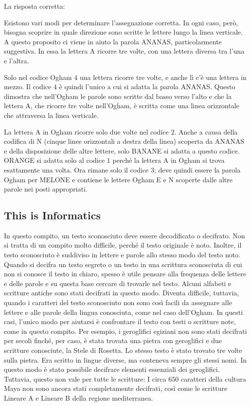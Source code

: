 \documentclass[a4paper,11pt]{report}
\newcommand{\taskGraphicsFolder}{..}
\begin{document}
La risposta corretta:

{\centering%
\par}

Esistono vari modi per determinare l’assegnazione corretta. In ogni caso, però, bisogna scoprire in quale direzione sono scritte le lettere lungo la linea verticale. A questo proposito ci viene in aiuto la parola ANANAS, particolarmente suggestiva. In essa la lettera A ricorre tre volte, con una lettera diversa tra l’una e l’altra.

Solo nel codice Ogham $4$ una lettera ricorre tre volte, e anche lì c’è una lettera in mezzo. Il codice $4$ è quindi l’unico a cui si adatta la parola ANANAS. Questo dimostra che nell’Ogham le parole sono scritte dal basso verso l’alto e che la lettera A, che ricorre tre volte nell’Ogham, è scritta come una linea orizzontale che attraversa la linea verticale.

La lettera A in Ogham ricorre solo due volte nel codice $2$. Anche a causa della codifica di N (cinque linee orizzontali a destra della linea) scoperta da ANANAS e della disposizione delle altre lettere, solo BANANE si adatta a questo codice. ORANGE si adatta solo al codice $1$ perché la lettera A in Ogham si trova esattamente una volta. Ora rimane solo il codice $3$; deve quindi essere la parola Ogham per MELONE e contiene le lettere Ogham E e N scoperte dalle altre parole nei posti appropriati.


\subsection*{This is Informatics}

In questo compito, un testo sconosciuto deve essere decodificato o decifrato.  Non si tratta di un compito molto difficile, perché il testo originale è noto. Inoltre, il testo sconosciuto è suddiviso in lettere e parole allo stesso modo del testo noto. Quando si decifra un testo segreto o un testo in una scrittura sconosciuta di cui non si conosce il testo in chiaro, spesso è utile pensare alla frequenza delle lettere e delle parole e su questa base cercare di trovarle nel testo. Alcuni alfabeti e scritture antiche sono stati decifrati in questo modo. Diventa difficile, tuttavia, quando i caratteri del testo sconosciuto non sono così facili da assegnare alle lettere e alle parole della lingua conosciuta, come nel caso dell’Ogham. In questi casi, l’unico modo per aiutarsi è confrontare il testo con testi o scritture note, come in questo compito. Per esempio, i geroglifici egiziani non sono stati decifrati per secoli finché, per caso, è stata trovata una pietra con geroglifici e due scritture conosciute, la Stele di Rosetta. Lo stesso testo è stato trovato tre volte sulla pietra. Era scritto in lingue diverse, ma conteneva sempre gli stessi nomi. In questo modo è stato possibile decifrare elementi essenziali dei geroglifici. Tuttavia, questo non vale per tutte le scritture: I circa $650$ caratteri della cultura Maya non sono ancora stati completamente decifrati, così come le scritture Lineare A e Lineare B della regione mediterranea.
\end{document}
